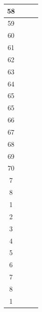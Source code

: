 \documentclass[11pt, a4paper]{article}
\begin{document}
\begin{landscape}
\begin{longtable}{|c|c|c|c|}
       58&         &                 &                     \\ \hline
       59&         &                 &                    \\ \hline
       60&         &                 &                     \\ \hline
       61&         &                 &                    \\ \hline
       62&         &                 &                     \\ \hline
       63&         &                 &                    \\ \hline
       64&         &                 &                     \\ \hline
       65&         &                 &                    \\ \hline
       65&         &                 &                     \\ \hline
       66&         &                 &                    \\ \hline
       67&         &                 &                     \\ \hline
       68&         &                 &                    \\ \hline
       69&         &                 &                     \\ \hline
       70&         &                 &                    \\ \hline
       7&         &                 &                     \\ \hline
       8&         &                 &                    \\ \hline
       1&         &                 &                     \\ \hline
       2&         &                 &                    \\ \hline
       3&         &                 &                     \\ \hline
       4&         &                 &                    \\ \hline
       5&         &                 &                     \\ \hline
       6&         &                 &                    \\ \hline
       7&         &                 &                     \\ \hline
       8&         &                 &                    \\ \hline
       1&         &                 &                     \\ \hline

\end{longtable}
\end{landscape}
\end{document}
